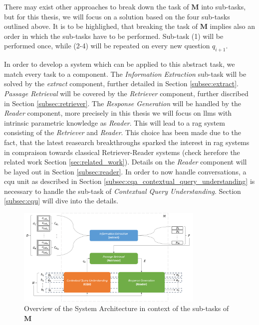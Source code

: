 There may exist other approaches to break down the task of $\mathbf{M}$ into sub-tasks, but for this thesis, we will focus on a solution based on the four sub-tasks outlined above. It is to be highlighed, that breaking the task of $\mathbf{M}$ implies also an order in which the sub-tasks have to be performed. Sub-task (1) will be performed once, while (2-4) will be repeated on every new question $q_{i+1}$.

In order to develop a system which can be applied to this abstract task, we match every task to a component. The \textit{Information Extraction} sub-task will be solved by the \textit{extract} component, further detailed in Section \ref{subsec:extract}. \textit{Passage Retrieval} will be covered by the \textit{Retriever} component, further discribed in Section \ref{subsec:retriever}. The \textit{Response Generation} will be handled by the \textit{Reader} component, more precisely in this thesis we will focus on \gls{llm}s with intrinsic parametric knowledge as \textit{Reader}. This will lead to a \gls{rag} system consisting of the \textit{Retriever} and \textit{Reader}. This choice has been made due to the fact, that the latest reasearch breakthroughs sparked the interest in \gls{rag} systems in compraison towards classical Retriever-Reader systems (check herefore the related work Section \ref{sec:related_work}). Details on the \textit{Reader} component will be layed out in Section \ref{subsec:reader}. In order to now handle conversations, a \gls{cqu} unit as described in Section \ref{subsec:cqa_contextual_query_understanding} is necessary to handle the sub-task of \textit{Contextual Query Understanding}. Section \ref{subsec:cqu} will dive into the details.

\begin{figure}
    \centering
    \includegraphics[width=0.8\textwidth]{Grafiken/conrag_konzeptionell.png}
    \caption{Overview of the System Architecture in context of the sub-tasks of $\mathbf{M}$}
    \label{fig:conrag_concept_system_architecture}
\end{figure}

